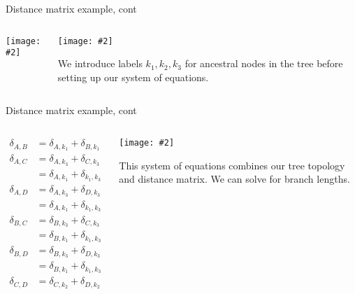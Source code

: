 \documentclass{beamer}
\renewcommand{\c}[1]{\begin{center}#1\end{center}}
\newcommand{\gr}[2][.95]{\c{\texttt{[image: \#2]}}}
\begin{document}
\begin{frame}{Distance matrix example, cont}
    \begin{columns}
        \begin{column}{0.5\textwidth}
            \gr[0.8]{l5_figs/s19_dist_matrix.png}
        \end{column}
        \begin{column}{0.5\textwidth}
            \gr[0.8]{l5_figs/s21_tree2.png}
            \footnotesize We introduce labels $k_1, k_2, k_3$ for ancestral nodes in the tree before setting up our system of equations.
        \end{column}
    \end{columns}
\end{frame}

\begin{frame}{Distance matrix example, cont}
    \begin{columns}
        \begin{column}{0.5\textwidth}
            \footnotesize
            \begin{align*}
                \delta_{A,B} &= \delta_{A,k_1} + \delta_{B,k_1} &= 2\\
                \delta_{A,C} &= \delta_{A,k_3} + \delta_{C,k_3}\\
                &= \delta_{A,k_1} + \delta_{k_1, k_3} + \delta_{C, k_2} + \delta_{k_2, k_3} &= 4\\
                \delta_{A, D} &= \delta_{A, k_3} + \delta_{D, k_3}\\
                &= \delta_{A, k_1} + \delta_{k_1, k_3} + \delta_{D, k_2} + \delta_{k_2, k_3} &= 4\\
                \delta_{B,C} &= \delta_{B,k_3} + \delta_{C,k_3}\\
                &= \delta_{B,k_1} + \delta_{k_1,k_3} + \delta_{C,k_2} + \delta_{k_2,k_3} &=4\\
                \delta_{B,D} &= \delta_{B,k_3} + \delta_{D,k_3}\\
                &= \delta_{B,k_1} + \delta_{k_1,k_3} + \delta_{D,k_2} + \delta_{k_2,k_3} &=4\\
                \delta_{C,D} &= \delta_{C,k_2} + \delta_{D,k_2} &= 2
            \end{align*}
        \end{column}
        \begin{column}{0.5\textwidth}
            \gr[0.8]{l5_figs/s21_tree2.png}
            \footnotesize This system of equations combines our tree topology and distance matrix. We can solve for branch lengths.
        \end{column}
    \end{columns}
\end{frame}
\end{document}
